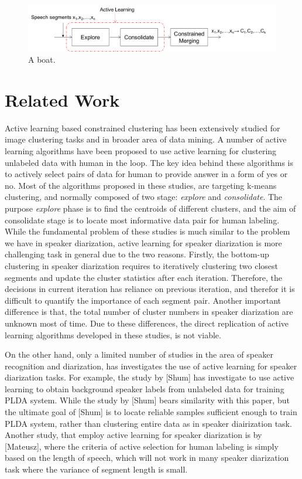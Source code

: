 \documentclass[final,authoryear,5p,times,twocolumn]{elsarticle}
\begin{document}
\begin{figure}
	\includegraphics[width=\linewidth]{figs/flow3}
	\caption{A boat.}
	\label{fig:boat1}
\end{figure}

\section{Related Work}
Active learning based constrained clustering has been extensively studied for image clustering tasks and in broader area of data mining. A number of active learning algorithms have been proposed to use active learning for clustering unlabeled data with human in the loop. The key idea behind these algorithms is to actively select pairs of data for human to provide answer in a form of yes or no. 
Most of the algorithms proposed in these studies, are targeting k-means clustering, and normally composed of two stage: \textit{explore} and \textit{consolidate}. The purpose \textit{explore} phase is to find the centroids of different clusters, and the aim of consolidate stage is to locate most informative data pair for human labeling. While the fundamental problem of these studies is much similar to the problem we have in speaker diarization, active learning for speaker diarization is more challenging task in general due to the two reasons. Firstly, the bottom-up clustering in speaker diarization requires to iteratively clustering two closest segments and update the cluster statistics after each iteration. Therefore, the decisions in current iteration has reliance on previous iteration, and therefor it is difficult to quantify the importance of each segment pair. Another important difference is that, the total number of cluster numbers in speaker diarization are unknown most of time. Due to these differences, the direct replication of active learning algorithms developed in these studies, is not viable.

On the other hand, only a limited number of studies in the area of speaker recognition and diarization, has investigates the use of active learning for speaker diarization tasks. For example, the study by [Shum] has investigate to use active learning to obtain background speaker labels from unlabeled data for training PLDA system. While the study by [Shum] bears similarity with this paper, but the ultimate goal of [Shum] is to locate reliable samples sufficient enough to train PLDA system, rather than clustering entire data as in speaker diairization task. Another study, that employ active learning for speaker diarization is by [Mateusz], where the criteria of active selection for human labeling is simply based on the length of speech, which will not work in many speaker diarization task where the variance of segment length is small.
\end{document}
